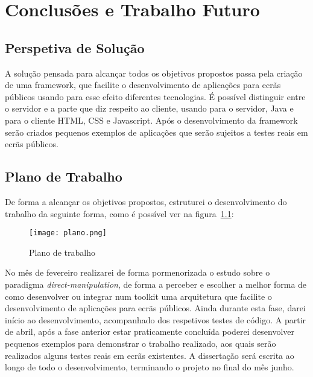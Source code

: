 \chapter{Conclusões e Trabalho Futuro} \label{chap:concl}

\section*{}

\section{Perspetiva de Solução}

A solução pensada para alcançar todos os objetivos propostos passa pela criação de uma framework, que facilite o desenvolvimento de aplicações para ecrãs públicos usando para esse efeito diferentes tecnologias. É possível distinguir entre o servidor e a parte que diz respeito ao cliente, usando para o servidor, Java e para o cliente HTML, CSS e Javascript.
Após o desenvolvimento da framework serão criados pequenos exemplos de aplicações que serão sujeitos a testes reais em ecrãs públicos.

\section{Plano de Trabalho}

De forma a alcançar os objetivos propostos, estruturei o desenvolvimento do trabalho da seguinte forma, como é possível ver na figura~\ref{fig:plano}:

\begin{figure}[h]
\centering
\texttt{[image: plano.png]}
\caption {Plano de trabalho}
\label{fig:plano}
\end{figure}

No mês de fevereiro realizarei de forma pormenorizada o estudo sobre o paradigma \textit{direct-manipulation}, de forma a perceber e escolher a melhor forma de como desenvolver ou integrar num toolkit uma arquitetura que facilite o desenvolvimento de aplicações para ecrãs públicos. Ainda durante esta fase, darei início ao desenvolvimento, acompanhado dos respetivos testes de código. A partir de abril, após a fase anterior estar praticamente concluída poderei desenvolver pequenos exemplos para demonstrar o trabalho realizado, aos quais serão realizados alguns testes reais em ecrãs existentes.
A dissertação será escrita ao longo de todo o desenvolvimento, terminando o projeto no final do mês junho. 